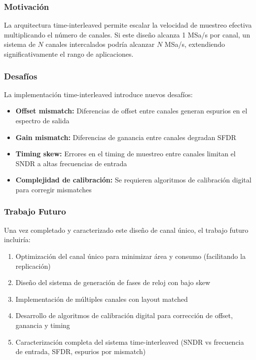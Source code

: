 \documentclass[12pt,a4paper]{report}
\begin{document}
\subsubsection{Motivación}

La arquitectura time-interleaved permite escalar la velocidad de muestreo efectiva multiplicando el número de canales. Si este diseño alcanza 1 MSa/s por canal, un sistema de $N$ canales intercalados podría alcanzar $N$ MSa/s, extendiendo significativamente el rango de aplicaciones.

\subsubsection{Desafíos}

La implementación time-interleaved introduce nuevos desafíos:
\begin{itemize}
    \item \textbf{Offset mismatch:} Diferencias de offset entre canales generan espurios en el espectro de salida
    \item \textbf{Gain mismatch:} Diferencias de ganancia entre canales degradan SFDR
    \item \textbf{Timing skew:} Errores en el timing de muestreo entre canales limitan el SNDR a altas frecuencias de entrada
    \item \textbf{Complejidad de calibración:} Se requieren algoritmos de calibración digital para corregir mismatches
\end{itemize}

\subsubsection{Trabajo Futuro}

Una vez completado y caracterizado este diseño de canal único, el trabajo futuro incluiría:
\begin{enumerate}
    \item Optimización del canal único para minimizar área y consumo (facilitando la replicación)
    \item Diseño del sistema de generación de fases de reloj con bajo skew
    \item Implementación de múltiples canales con layout matched
    \item Desarrollo de algoritmos de calibración digital para corrección de offset, ganancia y timing
    \item Caracterización completa del sistema time-interleaved (SNDR vs frecuencia de entrada, SFDR, espurios por mismatch)
\end{enumerate}
\end{document}
